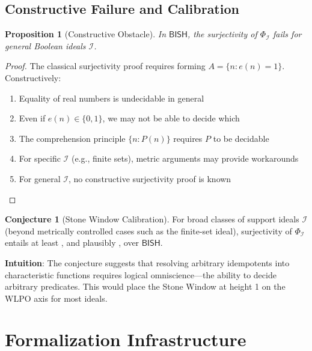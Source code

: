 \documentclass[11pt]{article}
\theoremstyle{plain}
\newtheorem{proposition}[theorem]{Proposition}
\theoremstyle{definition}
\newtheorem{conjecture}[theorem]{Conjecture}
\newcommand{\WLPO}{\mathrm{WLPO}}
\newcommand{\LLPO}{\mathrm{LLPO}}
\newcommand{\BISH}{\mathsf{BISH}}
\begin{document}
\subsection{Constructive Failure and Calibration}

\begin{proposition}[Constructive Obstacle]\label{prop:constructive-obstacle}
In $\BISH$, the surjectivity of $\Phi_{\mathcal{I}}$ fails for general Boolean ideals $\mathcal{I}$.
\end{proposition}

\begin{proof}
The classical surjectivity proof requires forming $A = \{n : e(n) = 1\}$. Constructively:
\begin{enumerate}
\item Equality of real numbers is undecidable in general
\item Even if $e(n) \in \{0, 1\}$, we may not be able to decide which
\item The comprehension principle $\{n : P(n)\}$ requires $P$ to be decidable
\item For specific $\mathcal{I}$ (e.g., finite sets), metric arguments may provide workarounds
\item For general $\mathcal{I}$, no constructive surjectivity proof is known
\end{enumerate}
\end{proof}

\begin{conjecture}[Stone Window Calibration]\label{conj:stone}
For broad classes of support ideals $\mathcal{I}$ (beyond metrically controlled cases such as the finite-set ideal), surjectivity of $\Phi_{\mathcal I}$ entails at least \LLPO, and plausibly \WLPO, over $\BISH$.
\end{conjecture}

\begin{intuitionbox}
\textbf{Intuition}: The conjecture suggests that resolving arbitrary idempotents into characteristic functions requires logical omniscience—the ability to decide arbitrary predicates. This would place the Stone Window at height 1 on the WLPO axis for most ideals.
\end{intuitionbox}

\section{Formalization Infrastructure}
\end{document}
